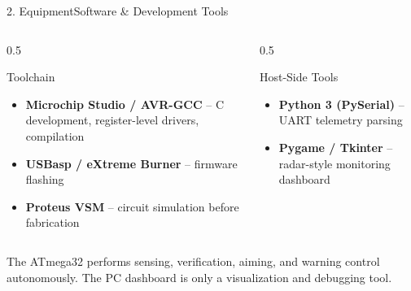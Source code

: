 \documentclass[aspectratio=169, 10pt]{beamer}
\begin{document}
\begin{frame}{2. Equipment}{Software \& Development Tools}
    \begin{columns}[T]
        \begin{column}{0.5\textwidth}
            \begin{block}{Toolchain}
                \small
                \begin{itemize}
                    \item \textbf{Microchip Studio / AVR-GCC} -- C development, register-level drivers, compilation
                    \item \textbf{USBasp / eXtreme Burner} -- firmware flashing
                    \item \textbf{Proteus VSM} -- circuit simulation before fabrication
                \end{itemize}
            \end{block}
        \end{column}
        \begin{column}{0.5\textwidth}
            \begin{block}{Host-Side Tools}
                \small
                \begin{itemize}
                    \item \textbf{Python 3 (PySerial)} -- UART telemetry parsing
                    \item \textbf{Pygame / Tkinter} -- radar-style monitoring dashboard
                \end{itemize}
            \end{block}
        \end{column}
    \end{columns}
    \vspace{0.2cm}
    \footnotesize\color{Dim} The ATmega32 performs sensing, verification, aiming, and warning control autonomously. The PC dashboard is only a visualization and debugging tool.
\end{frame}
\end{document}
